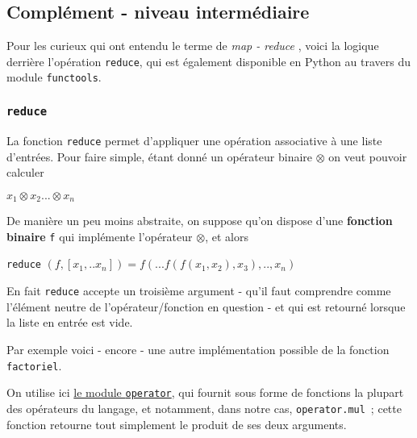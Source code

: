     \hypertarget{compluxe9ment---niveau-intermuxe9diaire}{%
\subsection{Complément - niveau
intermédiaire}\label{compluxe9ment---niveau-intermuxe9diaire}}

    Pour les curieux qui ont entendu le terme de \emph{map - reduce} , voici
la logique derrière l'opération \texttt{reduce}, qui est également
disponible en Python au travers du module \texttt{functools}.

    \hypertarget{reduce}{%
\subsubsection{\texorpdfstring{\texttt{reduce}}{reduce}}\label{reduce}}

    La fonction \texttt{reduce} permet d'appliquer une opération associative
à une liste d'entrées. Pour faire simple, étant donné un opérateur
binaire \(\otimes\) on veut pouvoir calculer

\(x_1 \otimes x_2 ... \otimes x_n\)

De manière un peu moins abstraite, on suppose qu'on dispose d'une
\textbf{fonction binaire} \texttt{f} qui implémente l'opérateur
\(\otimes\), et alors

\texttt{reduce}
\(( f, [x_1, .. x_n] ) = f ( ... f(f(x_1,x_2), x_3), .. , x_n)\)

    En fait \texttt{reduce} accepte un troisième argument - qu'il faut
comprendre comme l'élément neutre de l'opérateur/fonction en question -
et qui est retourné lorsque la liste en entrée est vide.

    Par exemple voici - encore - une autre implémentation possible de la
fonction \texttt{factoriel}.

On utilise ici \href{https://docs.python.org/3/library/operator.html}{le
module \texttt{operator}}, qui fournit sous forme de fonctions la
plupart des opérateurs du langage, et notamment, dans notre cas,
\texttt{operator.mul}~; cette fonction retourne tout simplement le
produit de ses deux arguments.

